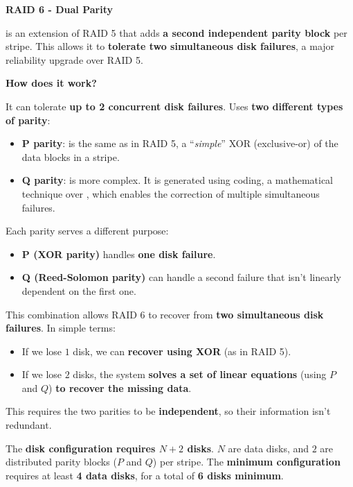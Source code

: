 \newpage

\begin{center}\label{RAID 6}
    \large
    \hypertarget{RAID 6}{\textcolor{Red2}{\textbf{RAID 6 - Dual Parity}}}
\end{center}
 is an extension of RAID 5 that adds \textbf{a second independent parity block} per stripe. This allows it to \textbf{tolerate two simultaneous disk failures}, a major reliability upgrade over RAID 5.

\highspace
\begin{flushleft}
    \textcolor{Green3}{ \textbf{How does it work?}}
\end{flushleft}
It can tolerate \textbf{up to 2 concurrent disk failures}. Uses \textbf{two different types of parity}:
\begin{itemize}
    \item \textbf{P parity}: is the same as in RAID 5, a ``\emph{simple}'' XOR (exclusive-or) of the data blocks in a stripe.
    \item \textbf{Q parity}: is more complex. It is generated using  coding, a mathematical technique over , which enables the correction of multiple simultaneous failures.
\end{itemize}
Each parity serves a different purpose:
\begin{itemize}
    \item \textbf{P (XOR parity)} handles \textbf{one disk failure}.
    \item \textbf{Q (Reed-Solomon parity)} can handle a second failure that isn't linearly dependent on the first one.
\end{itemize}
This combination allows RAID 6 to recover from \textbf{two simultaneous disk failures}. In simple terms:
\begin{itemize}
    \item If we lose $1$ disk, we can \textbf{recover using XOR} (as in RAID 5).
    \item If we lose $2$ disks, the system \textbf{solves a set of linear equations} (using $P$ and $Q$) \textbf{to recover the missing data}.
\end{itemize}
This requires the two parities to be \textbf{independent}, so their information isn't redundant.

\highspace
The \textbf{disk configuration requires $N+2$ disks}. $N$ are data disks, and $2$ are distributed parity blocks ($P$ and $Q$) per stripe. The \textbf{minimum configuration} requires at least \textbf{4 data disks}, for a total of \textbf{6 disks minimum}.

